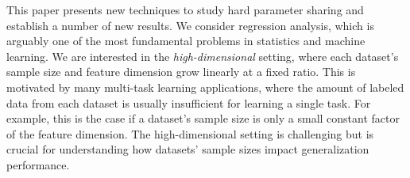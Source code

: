 This paper presents new techniques to study hard parameter sharing and establish a number of new results.
We consider regression analysis, which is arguably one of the most fundamental problems in statistics and machine learning.
We are interested in the \textit{high-dimensional} setting, where each dataset's sample size and feature dimension grow linearly at a fixed ratio.
This is motivated by many multi-task learning applications, where the amount of labeled data from each dataset is usually insufficient for learning a single task.
For example, this is the case if a dataset's sample size is only a small constant factor of the feature dimension.
The high-dimensional setting is challenging but is crucial for understanding how datasets' sample sizes impact generalization performance.
